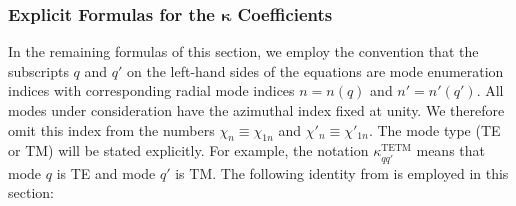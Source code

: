 \documentclass[11pt]{article}
\newcommand{\TE}{\text{TE}}
\newcommand{\TM}{\text{TM}}
\begin{document}
\subsubsection[Explicit Formulas for the  Kappa  Coefficients]%
{Explicit Formulas for the  $\boldsymbol{\kappa}$  Coefficients}
In the remaining formulas of this section, we employ the convention
that the subscripts $q$ and $q'$ on the left-hand sides of the
equations are mode enumeration indices with corresponding radial mode
indices $n=n(q)$ and $n' = n'(q')$. 
All modes under consideration have the azimuthal index fixed at
unity. We therefore omit this index from the numbers $\chi_n \equiv
\chi_{1n}$ and $\chi'_{n} \equiv \chi'_{1n}$. The mode type (TE or TM)
will be stated explicitly.  For example, the notation 
$\kappa^{\TE\TM}_{qq'}$ means that mode $q$ is TE and mode $q'$ is
TM.    The following identity
from \cite{pyat:94} is employed in this section:
\end{document}
